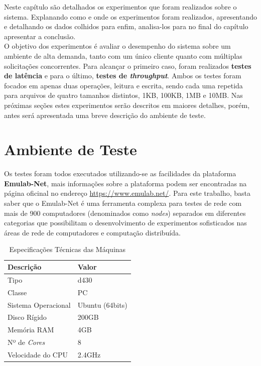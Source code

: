 	Neste capítulo são detalhados os experimentos que foram realizados sobre o sistema. Explanando como e onde os experimentos foram realizados, apresentando e detalhando os dados colhidos para enfim, analisa-los para no final do capítulo apresentar a conclusão.
	\\
	
	O objetivo dos experimentos é avaliar o desempenho do sistema sobre um ambiente de alta demanda, tanto com um único cliente quanto com múltiplas solicitações concorrentes. Para alcançar o primeiro caso, foram realizados \textbf{testes de latência} e para o último, \textbf{testes de \textit{throughput}}. Ambos os testes foram focados em apenas duas operações, leitura e escrita, sendo cada uma repetida para arquivos de quatro tamanhos distintos, 1KB, 100KB, 1MB e 10MB. Nas próximas seções estes experimentos serão descritos em maiores detalhes, porém, antes será apresentada uma breve descrição do ambiente de teste.
	\\
	
	\section{Ambiente de Teste}
	Os testes foram todos executados utilizando-se as facilidades da plataforma \textbf{Emulab-Net}, mais informações sobre a plataforma podem ser encontradas na página oficinal no endereço \href{https://www.emulab.net/}{https://www.emulab.net/}. Para este trabalho, basta saber que o Emulab-Net é uma ferramenta complexa para testes de rede com mais de 900 computadores (denominados como \textit{nodes}) separados em diferentes categorias que possibilitam o desenvolvimento de experimentos sofisticados nas áreas de rede de computadores e computação distribuída.
	\\
		
	\capstartfalse
	\begin{table} [htb]
		\caption{Especificações Técnicas das Máquinas}
		\centering
		\begin{tabular}{|l|l|} \hline
			\textbf{Descrição} 	& \textbf{Valor} \\ \hline
			
			Tipo				& d430\\ \hline
			Classe				& PC\\ \hline
			Sistema Operacional & Ubuntu (64bits)\\ \hline
			Disco Rígido		& 200GB \\ \hline
			Memória RAM			& 4GB \\ \hline
			Nº de \textit{Cores}& 8 \\ \hline
			Velocidade do CPU	& 2.4GHz  \\ \hline
						
		\end{tabular}
		\label{tab:exp_vm}
	\end{table}
	\capstarttrue
	

